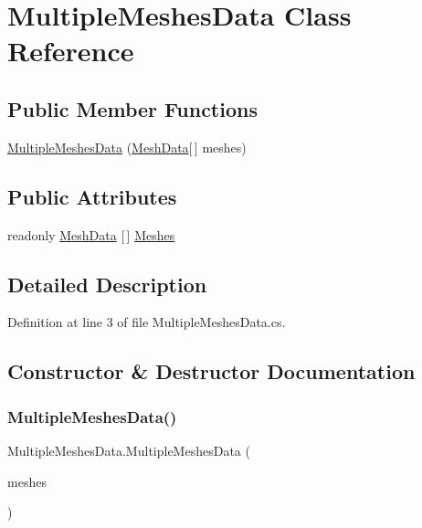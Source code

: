\hypertarget{class_multiple_meshes_data}{}\section{Multiple\+Meshes\+Data Class Reference}
\label{class_multiple_meshes_data}
\subsection*{Public Member Functions}
\begin{DoxyCompactItemize}
\item 
\mbox{\hyperlink{class_multiple_meshes_data_a3bab441917499d497ad6410a6fd7864d}{Multiple\+Meshes\+Data}} (\mbox{\hyperlink{class_mesh_data}{Mesh\+Data}}\mbox{[}$\,$\mbox{]} meshes)
\end{DoxyCompactItemize}
\subsection*{Public Attributes}
\begin{DoxyCompactItemize}
\item 
readonly \mbox{\hyperlink{class_mesh_data}{Mesh\+Data}} \mbox{[}$\,$\mbox{]} \mbox{\hyperlink{class_multiple_meshes_data_a70294a22d9584f7a4f280a799f308681}{Meshes}}
\end{DoxyCompactItemize}


\subsection{Detailed Description}


Definition at line 3 of file Multiple\+Meshes\+Data.\+cs.



\subsection{Constructor \& Destructor Documentation}
\mbox{\label{class_multiple_meshes_data_a3bab441917499d497ad6410a6fd7864d}} 
\subsubsection{\texorpdfstring{MultipleMeshesData()}{MultipleMeshesData()}}
{\footnotesize\ttfamily Multiple\+Meshes\+Data.\+Multiple\+Meshes\+Data (\begin{DoxyParamCaption}\item[{\mbox{\hyperlink{class_mesh_data}{Mesh\+Data}} \mbox{[}$\,$\mbox{]}}]{meshes }\end{DoxyParamCaption})}



